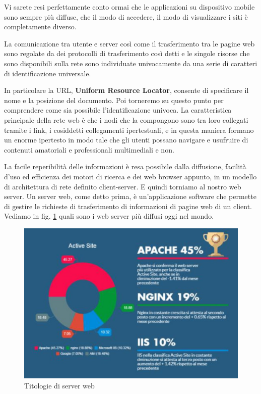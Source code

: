 Vi sarete resi perfettamente conto ormai che le applicazioni su dispositivo mobile sono sempre più diffuse, che il modo di accedere, il modo di visualizzare i siti è completamente diverso.

La comunicazione tra utente e server così come il trasferimento tra le pagine web sono regolate da dei protocolli di trasferimento così detti e le singole risorse che sono disponibili sulla rete sono individuate univocamente da una serie di caratteri di identificazione universale.

In particolare la URL, \textbf{Uniform Resource Locator}, consente di specificare il nome e la posizione del documento. Poi torneremo su questo punto per comprendere come sia possibile l'identificazione univoca. La caratteristica principale della rete web è che i nodi che la compongono sono tra loro collegati tramite i link, i cosiddetti collegamenti ipertestuali, e in questa maniera formano un enorme ipertesto in modo tale che gli utenti possano navigare e usufruire di contenuti amatoriali e professionali multimediali e non.

La facile reperibilità delle informazioni è resa possibile dalla diffusione, facilità d'uso ed efficienza dei motori di ricerca e dei web browser appunto, in un modello di architettura di rete definito client-server. E quindi torniamo al nostro web server. Un server web, come detto prima, è un'applicazione software che permette di gestire le richieste di trasferimento di informazioni di pagine web di un client. Vediamo in fig. \ref{fig:Tipologie di server web} quali sono i web server più diffusi oggi nel mondo.

\begin{figure}[ht]
    \centering
    \includegraphics[width=0.8\linewidth]{images/03_lez_fig_02.jpg}
    \caption{Titologie di server web}
    \label{fig:Tipologie di server web}
\end{figure}

